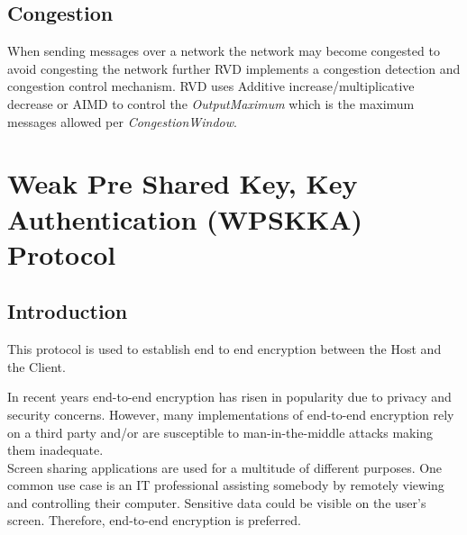 \documentclass{article}
\begin{document}
    \subsection{Congestion}

    When sending messages over a network the network may become congested to avoid congesting the network further RVD
    implements a congestion detection and congestion control mechanism. RVD uses Additive increase/multiplicative
    decrease or AIMD to control the \emph{OutputMaximum} which is the maximum messages allowed per
    \emph{CongestionWindow}.

%


    \section{Weak Pre Shared Key, Key Authentication (WPSKKA) Protocol}

    \subsection{Introduction}

    This protocol is used to establish end to end encryption between the Host and the Client.

    In recent years end-to-end encryption has risen in popularity due to privacy and
    security concerns. However, many implementations of end-to-end encryption rely
    on a third party and/or are susceptible to man-in-the-middle attacks making them
    inadequate.\\

    Screen sharing applications are used for a multitude of different purposes. One
    common use case is an IT professional assisting somebody by remotely viewing and
    controlling their computer. Sensitive data could be visible on the user's
    screen. Therefore, end-to-end encryption is preferred.\\
\end{document}
